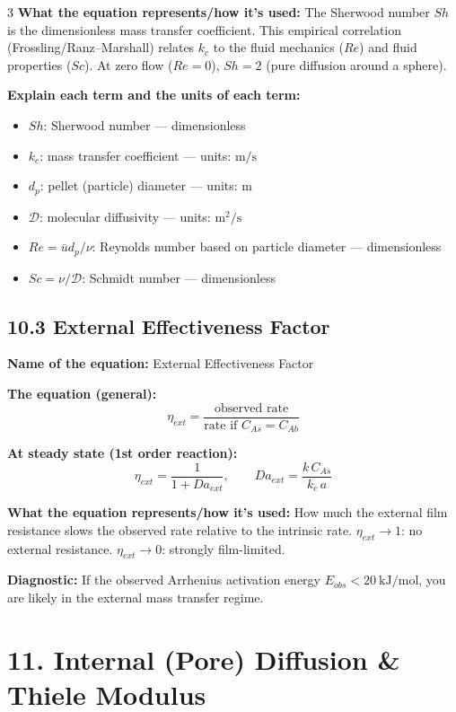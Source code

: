 \documentclass[8pt]{extarticle}
\begin{document}
\begin{multicols*}{3}
\textbf{What the equation represents/how it's used:} The Sherwood number \(Sh\) is the dimensionless mass transfer coefficient. This empirical correlation (Frossling/Ranz--Marshall) relates \(k_c\) to the fluid mechanics (\(Re\)) and fluid properties (\(Sc\)). At zero flow (\(Re=0\)), \(Sh=2\) (pure diffusion around a sphere).

\textbf{Explain each term and the units of each term:}
\begin{itemize}
\item \(Sh\): Sherwood number --- dimensionless
\item \(k_c\): mass transfer coefficient --- units: \(\mathrm{m/s}\)
\item \(d_p\): pellet (particle) diameter --- units: \(\mathrm{m}\)
\item \(\mathcal{D}\): molecular diffusivity --- units: \(\mathrm{m^2/s}\)
\item \(Re=\bar{u}d_p/\nu\): Reynolds number based on particle diameter --- dimensionless
\item \(Sc=\nu/\mathcal{D}\): Schmidt number --- dimensionless
\end{itemize}

\subsection*{10.3 External Effectiveness Factor}

\textbf{Name of the equation:} External Effectiveness Factor

\textbf{The equation (general):}
\[
\eta_{ext}
=
\frac{\text{observed rate}}{\text{rate if }C_{As}=C_{Ab}}
\]

\textbf{At steady state (1st order reaction):}
\[
\eta_{ext}=\frac{1}{1+Da_{ext}}, \qquad Da_{ext}=\frac{k\,C_{As}}{k_c\,a}
\]

\textbf{What the equation represents/how it's used:} How much the external film resistance slows the observed rate relative to the intrinsic rate. \(\eta_{ext}\to 1\): no external resistance. \(\eta_{ext}\to 0\): strongly film-limited.

\textbf{Diagnostic:} If the observed Arrhenius activation energy \(E_{obs}<20\ \mathrm{kJ/mol}\), you are likely in the external mass transfer regime.

\section*{11. Internal (Pore) Diffusion \& Thiele Modulus}


\end{multicols*}
\end{document}
